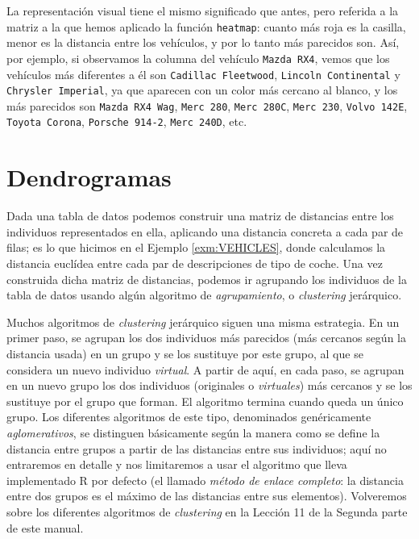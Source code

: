\documentclass[
]{book}
\theoremstyle{definition}
\theoremstyle{definition}
\theoremstyle{definition}
\theoremstyle{remark}
\begin{document}
La representación visual tiene el mismo significado que antes, pero referida a la matriz a la que hemos aplicado la función \texttt{heatmap}: cuanto más roja es la casilla, menor es la distancia entre los vehículos, y por lo tanto más parecidos son.
Así, por ejemplo, si observamos la columna del vehículo \texttt{Mazda\ RX4}, vemos que los vehículos más diferentes a él son \texttt{Cadillac\ Fleetwood}, \texttt{Lincoln\ Continental} y \texttt{Chrysler\ Imperial}, ya que aparecen con un color más cercano al blanco, y los más parecidos son \texttt{Mazda\ RX4\ Wag}, \texttt{Merc\ 280}, \texttt{Merc\ 280C}, \texttt{Merc\ 230}, \texttt{Volvo\ 142E}, \texttt{Toyota\ Corona},
\texttt{Porsche\ 914-2}, \texttt{Merc\ 240D}, etc.

\hypertarget{sec:dendr}{%
\section{Dendrogramas}\label{sec:dendr}}

Dada una tabla de datos podemos construir una matriz de distancias entre los individuos representados en ella, aplicando una distancia concreta a cada par de filas; es lo que hicimos en el Ejemplo \ref{exm:VEHICLES}, donde calculamos la distancia euclídea entre cada par de descripciones de tipo de coche. Una vez construida dicha matriz de distancias, podemos ir agrupando los individuos de la tabla de datos usando algún algoritmo de \emph{agrupamiento}, o \emph{clustering} jerárquico.

Muchos algoritmos de \emph{clustering} jerárquico siguen una misma estrategia. En un primer paso, se agrupan los dos individuos más parecidos (más cercanos según la distancia usada) en un grupo y se los sustituye por este grupo, al que se considera un nuevo individuo \emph{virtual}. A partir de aquí, en cada paso, se agrupan en un nuevo grupo los dos individuos (originales o \emph{virtuales}) más cercanos y se los sustituye por el grupo que forman. El algoritmo termina cuando queda un único grupo. Los diferentes algoritmos de este tipo, denominados genéricamente \emph{aglomerativos}, se distinguen básicamente según la manera como se define la distancia entre grupos a partir de las distancias entre sus individuos; aquí no entraremos en detalle y nos limitaremos a usar el algoritmo que lleva implementado R por defecto (el llamado \emph{método de enlace completo}: la distancia entre dos grupos es el máximo de las distancias entre sus elementos). Volveremos sobre los diferentes algoritmos de \emph{clustering} en la Lección 11 de la Segunda parte de este manual.
\end{document}
